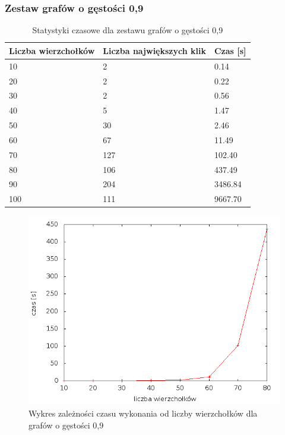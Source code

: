 \documentclass[12pt, a4paper]{article}
\begin{document}
\subsubsection*{Zestaw grafów o gęstości 0,9}
\begin{table}[H]
\caption{Statystyki czasowe dla zestawu grafów o gęstości 0,9}
\begin{center}
    \begin{tabular}{|l|l|l|}
    \hline
    Liczba wierzchołków & Liczba największych klik & Czas [s] \\ \hline
    10 & 2 & 0.14 \\ \hline
    20 & 2 & 0.22 \\ \hline
    30 & 2 & 0.56 \\ \hline
    40 & 5 & 1.47 \\ \hline
    50 & 30 & 2.46 \\ \hline
    60 & 67 & 11.49 \\ \hline
    70 & 127 & 102.40 \\ \hline
    80 & 106 & 437.49 \\ \hline
    90 & 204 & 3486.84 \\ \hline
    100 & 111 & 9667.70 \\ \hline
    \end{tabular}
\end{center}
\end{table}

\begin{figure}[h]
    \begin{center}
	\includegraphics[scale=0.5]{results/img/den/den_09.png}
	\caption{Wykres zależności czasu wykonania od liczby wierzchołków dla grafów o gęstości 0,9}
    \end{center}
\end{figure}
\end{document}
